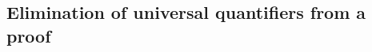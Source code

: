 \documentclass[UKenglish,acmsmall,authorversion]{acmart}
\theoremstyle{plain}
\begin{document}
\subsection{Elimination of universal quantifiers from a proof}

%
\end{document}
